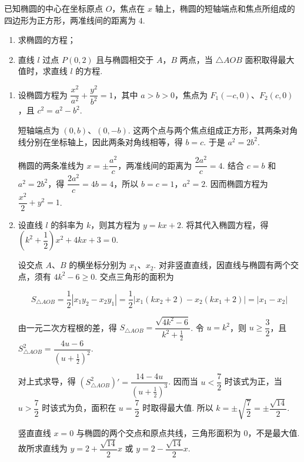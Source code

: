 \begin{problem}
已知椭圆的中心在坐标原点 \(O\)，焦点在 \(x\) 轴上，椭圆的短轴端点和焦点所组成的四边形为正方形，两准线间的距离为 \(4\).

\begin{enumerate}
\item 求椭圆的方程；
\item 直线 \(l\) 过点 \(P(0,2)\) 且与椭圆相交于 \(A\)，\(B\) 两点，当 \(\triangle AOB\) 面积取得最大值时，求直线 \(l\) 的方程.
\end{enumerate}
\end{problem}

\begin{solution}
\begin{enumerate}
\item 设椭圆方程为 \(\dfrac{x^2}{a^2}+\dfrac{y^2}{b^2}=1\)，其中 \(a>b>0\)，焦点为 \(F_1(-c,0)\)、\(F_2(c,0)\)，且 \(c^2=a^2-b^2\).

短轴端点为 \((0,b)\)、\((0,-b)\). 这两个点与两个焦点组成正方形，其两条对角线分别在坐标轴上，因此两条对角线相等，得 \(b=c\). 于是 \(a^2=2b^2\).

椭圆的两条准线为 \(x=\pm\dfrac{a^2}{c}\)，两准线间的距离为 \(\dfrac{2a^2}{c}=4\). 结合 \(c=b\) 和 \(a^2=2b^2\)，得 \(\dfrac{2a^2}{c}=4b=4\)，所以 \(b=c=1\)，\(a^2=2\). 因而椭圆方程为 \(\dfrac{x^2}{2}+y^2=1\).
\item 设直线 \(l\) 的斜率为 \(k\)，则其方程为 \(y=kx+2\). 将其代入椭圆方程，得 \(\left(k^2+\dfrac12\right)x^2+4kx+3=0\).

设交点 \(A\)、\(B\) 的横坐标分别为 \(x_1\)、\(x_2\). 对非竖直直线，因直线与椭圆有两个交点，须有 \(4k^2-6\geqslant0\). 交点三角形的面积为

\[S_{\triangle AOB}=\frac12|x_1y_2-x_2y_1|=\frac12|x_1(kx_2+2)-x_2(kx_1+2)|=|x_1-x_2|\]

由一元二次方程根的差，得 \(S_{\triangle AOB}=\dfrac{\sqrt{4k^2-6}}{k^2+\frac12}\). 令 \(u=k^2\)，则 \(u\geqslant\dfrac32\)，且 \(S_{\triangle AOB}^2=\dfrac{4u-6}{\left(u+\frac12\right)^2}\).

对上式求导，得 \(\left(S_{\triangle AOB}^2\right)'=\dfrac{14-4u}{\left(u+\frac12\right)^3}\). 因而当 \(u<\dfrac72\) 时该式为正，当 \(u>\dfrac72\) 时该式为负，面积在 \(u=\dfrac72\) 时取得最大值. 所以 \(k=\pm\sqrt{\dfrac72}=\pm\dfrac{\sqrt{14}}{2}\).

竖直直线 \(x=0\) 与椭圆的两个交点和原点共线，三角形面积为 \(0\)，不是最大值. 故所求直线为 \(y=2+\dfrac{\sqrt{14}}{2}x\) 或 \(y=2-\dfrac{\sqrt{14}}{2}x\).
\end{enumerate}
\end{solution}

